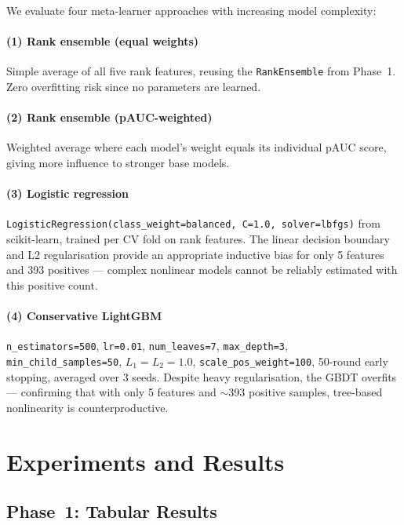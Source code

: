 \documentclass[conference]{IEEEtran}
\begin{document}
We evaluate four meta-learner approaches with increasing model
complexity:

\paragraph{(1) Rank ensemble (equal weights)}
Simple average of all five rank features, reusing the
\texttt{RankEnsemble} from Phase~1. Zero overfitting risk since
no parameters are learned.

\paragraph{(2) Rank ensemble (pAUC-weighted)}
Weighted average where each model's weight equals its individual
pAUC score, giving more influence to stronger base models.

\paragraph{(3) Logistic regression}
\texttt{LogisticRegression(class\_weight=balanced, C=1.0, solver=lbfgs)}
from scikit-learn, trained per CV fold on rank features.
The linear decision boundary and L2 regularisation provide an
appropriate inductive bias for only 5 features and 393 positives ---
complex nonlinear models cannot be reliably estimated with this
positive count.

\paragraph{(4) Conservative LightGBM}
\texttt{n\_estimators=500}, \texttt{lr=0.01}, \texttt{num\_leaves=7},
\texttt{max\_depth=3}, \texttt{min\_child\_samples=50},
$L_1{=}L_2{=}1.0$, \texttt{scale\_pos\_weight=100}, 50-round early
stopping, averaged over 3 seeds. Despite heavy regularisation, the
GBDT overfits --- confirming that with only 5 features and $\sim$393
positive samples, tree-based nonlinearity is counterproductive.

\section{Experiments and Results}

\subsection{Phase~1: Tabular Results}
\end{document}
